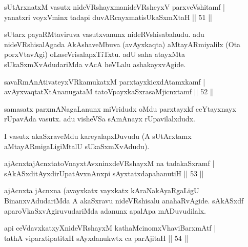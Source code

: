 
\begin{shl}
sUtArxnatxM vasutx nideVRshayxmanideVRsheyxV parxveVshitamf |\\
yanatxri voyxVminx tadapi duvARcayxmatisUkaSxmXtaH \hfill || 51 ||
\end{shl}

\begin{artha}
sUtarx payaRMtaviruva vasutxvanunx nideRVshisabahudu. adu nideVRshisa\-lAgada AkAshaveMbuva (avAyxkaqta) aMtayARmiyalilx (Ota porxVtavAgi) oLaseVrisalapxTiTxtu. adU saha atayxMta sUkaSxmXvAdudariMda vAcA heVLalu ashakayxvAgide.
\end{artha}


\begin{shl}
savaRmAnAtivateyxVRkamukatxM parxtayxkicxdAtamxkamf |\\
avAyxvaqtatXtAnanugataM tatoV\s payxkaSxrasaMjicnxtamf \hfill || 52 ||
\end{shl}

\begin{artha}
samasatx parxmANagaLanunx miVridudx oMdu parxtayxkf ceYtayxnayx rUpavAda vasutx. adu visheVSa sAmAnayx rUpavilalxdudx.

I vasutx akaSxraveMdu kareyalapxDuvudu (A sUtArxtamx aMtayARmigaLi\-giMtalU sUkaSxmXvAdudu).
\end{artha}


\begin{shl}
ajAcnxtajAcnxtatoV\s nayxtAvxninxdeVRshayxM na tadakaSxramf |\\
sAkASxditAyxdirUpatAvxnAnxpi sAyxtatxdapahanutiH \hfill || 53 ||
\end{shl}

\begin{artha}
ajAcnxta jAcnxna (avayxkatx vayxkatx kAraNakAyaRgaLigU BinanxvAdudariMda A akaSxravu nideVRshisalu anahaRvAgide. sAkASxdf aparoVkaSxvAgiruvudariMda adanunx apalApa mADuvudilalx.
\end{artha}%

\begin{shl}
api ceVdavxkatxyXnideVRshayxM kathaMcinomxVhaviBarxmAtf |\\
tathA viparxtipatitxH sAyxdanukwtx ca parAjitaH \hfill || 54 ||
\end{shl}

